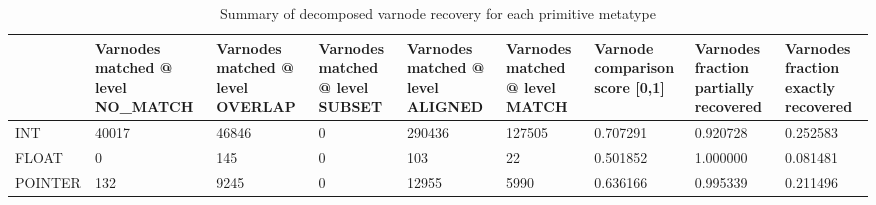 \begin{table}[t]
\centering
\caption{Summary of decomposed varnode recovery for each primitive metatype}
\label{table:metatype-recovery-summary-with-levels-decomposed}
\begin{tabular}{lp{2.2cm}p{2.2cm}p{2.2cm}p{2.2cm}p{2.2cm}p{2.2cm}p{2.2cm}p{2.2cm}}
\toprule
{} &  Varnodes matched @ level NO\_MATCH &  Varnodes matched @ level OVERLAP &  Varnodes matched @ level SUBSET &  Varnodes matched @ level ALIGNED &  Varnodes matched @ level MATCH &  Varnode comparison score [0,1] &  Varnodes fraction partially recovered &  Varnodes fraction exactly recovered \\
\midrule
INT     &                              40017 &                             46846 &                                0 &                            290436 &                          127505 &                        0.707291 &                               0.920728 &                             0.252583 \\
FLOAT   &                                  0 &                               145 &                                0 &                               103 &                              22 &                        0.501852 &                               1.000000 &                             0.081481 \\
POINTER &                                132 &                              9245 &                                0 &                             12955 &                            5990 &                        0.636166 &                               0.995339 &                             0.211496 \\
\bottomrule
\end{tabular}
\end{table}
